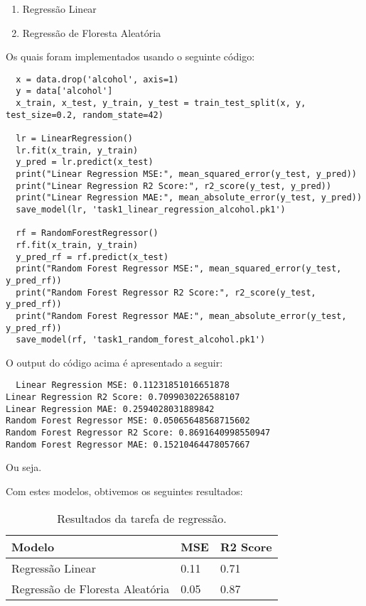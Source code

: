 \documentclass{article}
\begin{document}
\begin{enumerate}
  \item Regressão Linear
  \item Regressão de Floresta Aleatória
\end{enumerate}

Os quais foram implementados usando o seguinte código:

\begin{verbatim}
  x = data.drop('alcohol', axis=1)
  y = data['alcohol']
  x_train, x_test, y_train, y_test = train_test_split(x, y, test_size=0.2, random_state=42)

  lr = LinearRegression()
  lr.fit(x_train, y_train)
  y_pred = lr.predict(x_test)
  print("Linear Regression MSE:", mean_squared_error(y_test, y_pred))
  print("Linear Regression R2 Score:", r2_score(y_test, y_pred))
  print("Linear Regression MAE:", mean_absolute_error(y_test, y_pred))
  save_model(lr, 'task1_linear_regression_alcohol.pk1')

  rf = RandomForestRegressor()
  rf.fit(x_train, y_train)
  y_pred_rf = rf.predict(x_test)
  print("Random Forest Regressor MSE:", mean_squared_error(y_test, y_pred_rf))
  print("Random Forest Regressor R2 Score:", r2_score(y_test, y_pred_rf))
  print("Random Forest Regressor MAE:", mean_absolute_error(y_test, y_pred_rf))
  save_model(rf, 'task1_random_forest_alcohol.pk1')
\end{verbatim}

O output do código acima é apresentado a seguir:

\begin{verbatim}
  Linear Regression MSE: 0.11231851016651878
Linear Regression R2 Score: 0.7099030226588107
Linear Regression MAE: 0.2594028031889842
Random Forest Regressor MSE: 0.05065648568715602
Random Forest Regressor R2 Score: 0.8691640998550947
Random Forest Regressor MAE: 0.15210464478057667
\end{verbatim}

Ou seja.

Com estes modelos, obtivemos os seguintes resultados:

\begin{table}[ht]
  \centering
  \begin{tabular}{@{}lll@{}}
    \toprule
    Modelo & MSE & R2 Score \\ \midrule
    Regressão Linear & 0.11 & 0.71 \\
    Regressão de Floresta Aleatória & 0.05 & 0.87 \\ \bottomrule
  \end{tabular}
  \caption{Resultados da tarefa de regressão.}
  \label{tab:task1_results}
\end{table}
\end{document}
